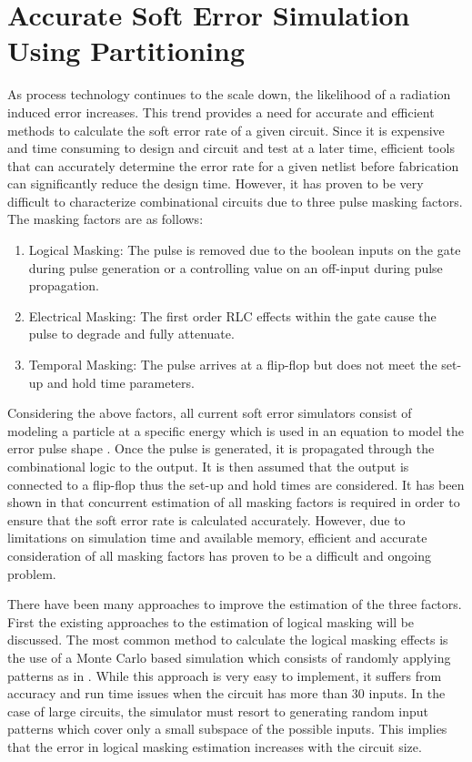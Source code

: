 \chapter{Accurate Soft Error Simulation Using Partitioning} \label{ch3}

As process technology continues to the scale down, the likelihood of a radiation induced error increases. This trend provides a need for accurate and efficient methods to calculate the soft error rate of a given circuit. Since it is expensive and time consuming to design and circuit and test at a later time, efficient tools that can accurately determine the error rate for a given netlist before fabrication can significantly reduce the design time. However, it has proven to be very difficult to characterize combinational circuits due to three pulse masking factors. The masking factors are as follows:

\begin{enumerate}
	\item Logical Masking: The pulse is removed due to the boolean inputs on the gate during pulse generation or a controlling value on an off-input during pulse propagation.
	
	\item Electrical Masking: The first order RLC effects within the gate cause the pulse to degrade and fully attenuate.
	
	\item Temporal Masking: The pulse arrives at a flip-flop but does not meet the set-up and hold time parameters. 
\end{enumerate}

Considering the above factors, all current soft error simulators consist of modeling a particle at a specific energy which is used in an equation to model the error pulse shape \cite{injeq}. Once the pulse is generated, it is propagated through the combinational logic to the output. It is then assumed that the output is connected to a flip-flop thus the set-up and hold times are considered. It has been shown in \cite{MARS_C,METSys} that concurrent estimation of all masking factors is required in order to ensure that the soft error rate is calculated accurately. However, due to limitations on simulation time and available memory, efficient and accurate consideration of all masking factors has proven to be a difficult and ongoing problem. 

There have been many approaches to improve the estimation of the three factors. First the existing approaches to the estimation of logical masking will be discussed. The most common method to calculate the logical masking effects is the use of a Monte Carlo based simulation which consists of randomly applying patterns as in \cite{Accurate_Masking,SERA,SEMM,PARAM_DESC,SETA_LA}. While this approach is very easy to implement, it suffers from accuracy and run time issues when the circuit has more than 30 inputs. In the case of large circuits, the simulator must resort to generating random input patterns which cover only a small subspace of the possible inputs. This implies that the error in logical masking estimation increases with the circuit size. 

